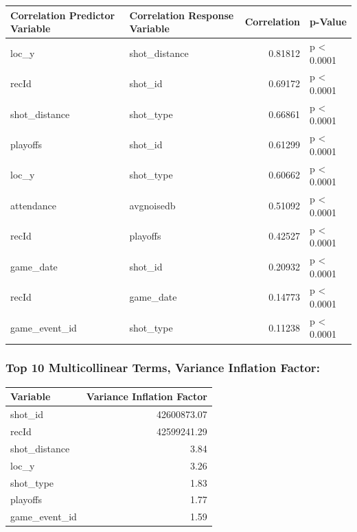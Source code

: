 \documentclass[american,]{article}
\begin{document}
\begin{table}[H]
\centering
\begin{tabular}{llrl}
\toprule
Correlation Predictor Variable & Correlation Response Variable & Correlation & p-Value\\
\midrule
\rowcolor{gray!6}  loc\_y & shot\_distance & 0.81812 & p < 0.0001\\
recId & shot\_id & 0.69172 & p < 0.0001\\
\rowcolor{gray!6}  shot\_distance & shot\_type & 0.66861 & p < 0.0001\\
playoffs & shot\_id & 0.61299 & p < 0.0001\\
\rowcolor{gray!6}  loc\_y & shot\_type & 0.60662 & p < 0.0001\\
\addlinespace
attendance & avgnoisedb & 0.51092 & p < 0.0001\\
\rowcolor{gray!6}  recId & playoffs & 0.42527 & p < 0.0001\\
game\_date & shot\_id & 0.20932 & p < 0.0001\\
\rowcolor{gray!6}  recId & game\_date & 0.14773 & p < 0.0001\\
game\_event\_id & shot\_type & 0.11238 & p < 0.0001\\
\bottomrule
\end{tabular}
\end{table}

\hypertarget{top-10-multicollinear-terms-variance-inflation-factor}{%
\subsubsection{\texorpdfstring{\textbf{Top 10 Multicollinear Terms, Variance Inflation Factor:}}{Top 10 Multicollinear Terms, Variance Inflation Factor:}}\label{top-10-multicollinear-terms-variance-inflation-factor}}

\begin{table}[H]
\centering
\begin{tabular}{lr}
\toprule
Variable & Variance Inflation Factor\\
\midrule
\rowcolor{gray!6}  shot\_id & 42600873.07\\
recId & 42599241.29\\
\rowcolor{gray!6}  shot\_distance & 3.84\\
loc\_y & 3.26\\
\rowcolor{gray!6}  shot\_type & 1.83\\
\addlinespace
playoffs & 1.77\\
\rowcolor{gray!6}  game\_event\_id & 1.59\\
\bottomrule
\end{tabular}
\end{table}
\end{document}
